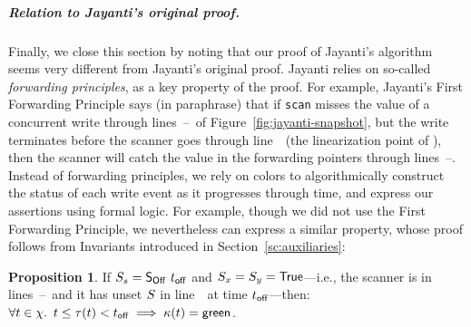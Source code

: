 \documentclass[a4paper,UKenglish]{lipics-v2016}
\newcommand{\hist}{\chi}
\newcommand{\ldot}{\mathord{.}\,}
\def\TT{\mathsf{True}}
\newcommand{\E}{\tau}
\newcommand{\C}{\kappa}
\newcommand{\sOff}{\mathsf{S_{Off}}}
\theoremstyle{definition}
\newtheorem{myprop}[theorem]{Proposition}
\begin{document}
\subparagraph*{Relation to Jayanti's original proof.}
\label{sec:relat-jayant-orig}
%
Finally, we close this section by noting that our proof of Jayanti's
algorithm seems very different from Jayanti's original proof. Jayanti
relies on so-called \emph{forwarding principles}, as a key property of
the proof. For example, Jayanti's First Forwarding Principle says (in
paraphrase) that if {\tt scan} misses the value of a concurrent write
through lines~\lineScanReadsX--\lineScanReadsY\ of
Figure~\ref{fig:jayanti-snapshot}, but the write terminates before the
scanner goes through line~\lineScanUnsetsS\ (the linearization point
of \jyscan), then the scanner will catch the value in the forwarding
pointers through lines~\lineScanReadsFX--\lineScanReadsFY.
%
Instead of forwarding principles, we rely on colors to algorithmically
construct the status of each write event as it progresses through
time, and express our assertions using formal logic. For example,
though we did not use the First Forwarding Principle, we nevertheless
can express a similar property, whose proof follows from
Invariants introduced in Section~\ref{sc:auxiliaries}:
%
\begin{myprop}\label{inv:fwd1}%
If $\sss = \sOff\ \toff$ and $\sx = \sy = \TT$---i.e., the scanner is
in lines~\lineScanReadsFX--\lineScanChoosesRY\ and it has unset $S$
in line~\lineScanUnsetsS\ at time $t_{\mathsf{off}}$---then: $ \forall t \in
\hist\ldot\ t \leq \E(t)< \toff \implies \C(t)= \mathsf{green}$.
\end{myprop}


%
\end{document}
